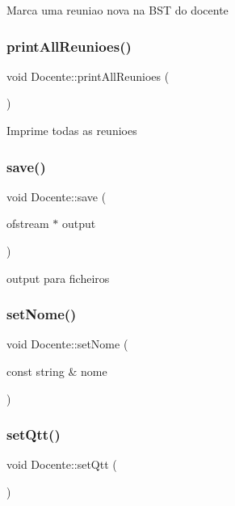 Marca uma reuniao nova na B\+ST do docente \hypertarget{class_docente_afb6708e3f626bb7dcdeba6e568b69e5c}{}\label{class_docente_afb6708e3f626bb7dcdeba6e568b69e5c} 
\subsubsection{\texorpdfstring{print\+All\+Reunioes()}{printAllReunioes()}}
{\footnotesize\ttfamily void Docente\+::print\+All\+Reunioes (\begin{DoxyParamCaption}{ }\end{DoxyParamCaption})}

Imprime todas as reunioes \hypertarget{class_docente_a4c4a09cf3c7f03a6b45a9b2c98c4e815}{}\label{class_docente_a4c4a09cf3c7f03a6b45a9b2c98c4e815} 
\subsubsection{\texorpdfstring{save()}{save()}}
{\footnotesize\ttfamily void Docente\+::save (\begin{DoxyParamCaption}\item[{ofstream $\ast$}]{output }\end{DoxyParamCaption})}

output para ficheiros \hypertarget{class_docente_a5e41a574e7adf0062530b80687224bc1}{}\label{class_docente_a5e41a574e7adf0062530b80687224bc1} 
\subsubsection{\texorpdfstring{set\+Nome()}{setNome()}}
{\footnotesize\ttfamily void Docente\+::set\+Nome (\begin{DoxyParamCaption}\item[{const string \&}]{nome }\end{DoxyParamCaption})}

\hypertarget{class_docente_a63f5f1b1a094a2366a148b33043f1f2d}{}\label{class_docente_a63f5f1b1a094a2366a148b33043f1f2d} 
\subsubsection{\texorpdfstring{set\+Qtt()}{setQtt()}}
{\footnotesize\ttfamily void Docente\+::set\+Qtt (\begin{DoxyParamCaption}{ }\end{DoxyParamCaption})}


